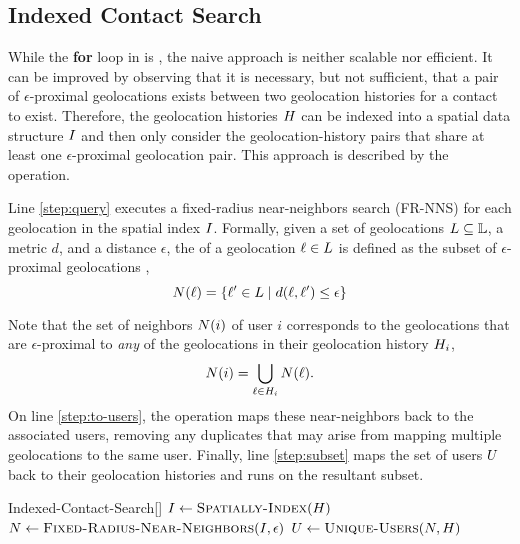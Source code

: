 \subsection{Indexed Contact Search}

While the \textbf{for} loop in  is  \citep[p. 14]{Herlihy2012}, the naive approach is neither scalable nor efficient. It can be improved by observing that it is necessary, but not sufficient, that a pair of $\epsilon$-proximal geolocations exists between two geolocation histories for a contact to exist. Therefore, the geolocation histories $H$ can be indexed into a spatial data structure $I$ \citep{Mokbel2003, Dinh2010, Mahmood2019} and then only consider the geolocation-history pairs that share at least one $\epsilon$-proximal geolocation pair. This approach is described by the  operation.

Line \ref{step:query} executes a fixed-radius near-neighbors search (FR-NNS) \citep{Bentley1975, Brin1995} for each geolocation in the spatial index $I$. Formally, given a set of geolocations $L \subseteq \mathbb{L}$, a metric $d$, and a distance $\epsilon$, the  of a geolocation $\ell \in L$ is defined as the subset of $\epsilon$-proximal geolocations \citep{Brin1995},
\begin{equation*}
  N(\ell) = \{\ell' \in L \mid d(\ell, \ell') \leq \epsilon\}
\end{equation*}

Note that the set of neighbors $N(i)$ of user $i$ corresponds to the geolocations that are $\epsilon$-proximal to \emph{any} of the geolocations in their geolocation history $H_i$,
\begin{equation*}
  N(i) = \bigcup_{\ell \in H_i} N(\ell).
\end{equation*}
On line \ref{step:to-users}, the operation  maps these near-neighbors back to the associated users, removing any duplicates that may arise from mapping multiple geolocations to the same user. Finally, line \ref{step:subset} maps the set of users $U$ back to their geolocation histories and runs  on the resultant subset.

\begin{function}{Indexed-Contact-Search}[\histories]
  \State $\sindex \assign \Call{Spatially-Index}{\histories}$
  \State $\query \assign \Call{Fixed-Radius-Near-Neighbors}{\sindex, \epsilon}$ \label{step:query}
  \State $\users \assign \Call{Unique-Users}{\query, \histories}$ \label{step:to-users}
  \State \Return {} \label{step:subset}
\end{function}

